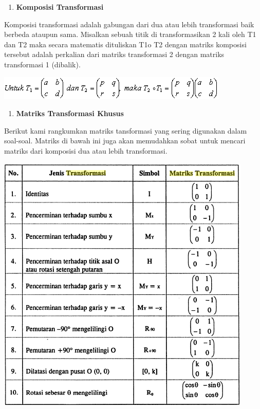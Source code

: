 \documentclass[11pt,fleqn]{book} %
\begin{document}
\noindent

\begin{enumerate}
	\item  \textbf{Komposisi Transformasi}
\end{enumerate}
\noindent
Komposisi transformasi adalah gabungan dari dua atau lebih transformasi baik berbeda ataupun sama.  Misalkan sebuah titik di transformasikan 2 kali oleh T1 dan T2 maka secara matematis dituliskan T1o T2 dengan matriks komposisi tersebut adalah perkalian dari matriks transformasi 2 dengan matriks transformasi 1 (dibalik).

\noindent
\begin{center}
\includegraphics{Pictures/18.PNG}\\
\end{center}
\noindent
\begin{enumerate}
	\item  \textbf{Matriks Transformasi Khusus}
\end{enumerate}
\noindent
Berikut kami rangkumkan matriks tansformasi yang sering digunakan dalam soal-soal. Matriks di bawah ini juga akan memudahkan sobat untuk mencari matriks dari komposisi dua atau lebih transformasi.

\noindent
\begin{center}
\includegraphics{Pictures/19.PNG}\\
\end{center}
\end{document}
